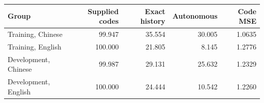 \begin{tabular}{lrrrr}
\toprule
Group & Supplied codes & Exact history & Autonomous & Code MSE \\
\midrule
Training, Chinese & 99.947 & 35.554 & 30.005 & 1.0635 \\
Training, English & 100.000 & 21.805 & 8.145 & 1.2776 \\
Development, Chinese & 99.987 & 29.131 & 25.632 & 1.2329 \\
Development, English & 100.000 & 24.444 & 10.542 & 1.2260 \\
\bottomrule
\end{tabular}
